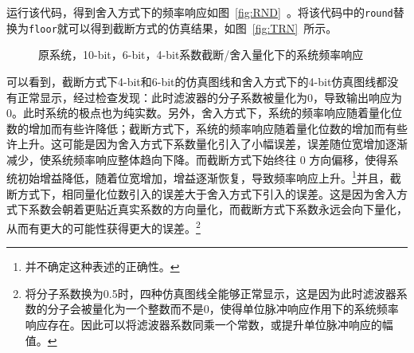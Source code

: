 \documentclass[lang=cn,newtx,10pt,scheme=chinese]{elegantbook}
\begin{document}
运行该代码，得到舍入方式下的频率响应如图~\ref{fig:RND}~。将该代码中的\texttt{round}替换为\texttt{floor}就可以得到截断方式的仿真结果，如图~\ref{fig:TRN}~所示。
\begin{figure}[htbp]
  \centering
  \hfill
  \caption{原系统，10-bit，6-bit，4-bit系数截断/舍入量化下的系统频率响应}
\end{figure}

可以看到，截断方式下4-bit和6-bit的仿真图线和舍入方式下的4-bit仿真图线都没有正常显示，经过检查发现：此时滤波器的分子系数被量化为0，导致输出响应为0。此时系统的极点也为纯实数。另外，舍入方式下，系统的频率响应随着量化位数的增加而有些许降低；截断方式下，系统的频率响应随着量化位数的增加而有些许上升。这可能是因为舍入方式下系数量化引入了小幅误差，误差随位宽增加逐渐减少，使系统频率响应整体趋向下降。而截断方式下始终往 0 方向偏移，使得系统初始增益降低，随着位宽增加，增益逐渐恢复，导致频率响应上升。\footnote{并不确定这种表述的正确性。}并且，截断方式下，相同量化位数引入的误差大于舍入方式下引入的误差。这是因为舍入方式下系数会朝着更贴近真实系数的方向量化，而截断方式下系数永远会向下量化，从而有更大的可能性获得更大的误差。\footnote{将分子系数换为0.5时，四种仿真图线全能够正常显示，这是因为此时滤波器系数的分子会被量化为一个整数而不是0，使得单位脉冲响应作用下的系统频率响应存在。因此可以将滤波器系数同乘一个常数，或提升单位脉冲响应的幅值。}
\end{document}
